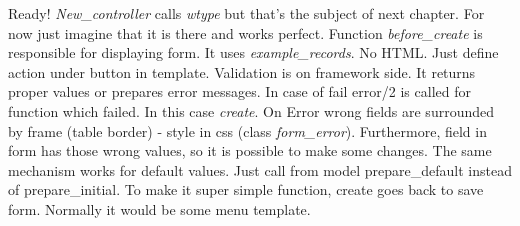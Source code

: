 Ready! \emph{New\_controller} calls {\it wtype} but that's the subject of next
chapter. For now just imagine that it is there and works perfect. Function
\emph{before\_create} is responsible for displaying form. It uses
\emph{example\_records}. No HTML. Just define action under button in
template. Validation is on framework side. It returns proper values or
prepares error messages. In case of fail error/2 is called for
function which failed. In this case \emph{create}. On Error wrong fields
are surrounded by frame (table border) - style in css (class
{\it form\_error}). Furthermore, field in form has those wrong values, so it is
possible to make some changes. The same mechanism works for default
values. Just call from model prepare\_default instead of prepare\_initial. To
make it super simple function, create goes back to save form. Normally it would
be some menu template.
 
